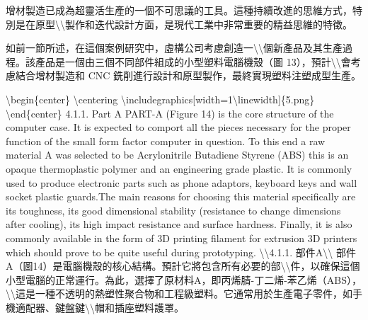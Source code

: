 增材製造已成為超靈活生產的一個不可思議的工具。這種持續改進的思維方式，特別是在原型\textbackslash\textbackslash 製作和迭代設計方面，是現代工業中非常重要的精益思維的特徵。

如前一節所述，在這個案例研究中，虛構公司考慮創造一\textbackslash\textbackslash 個新產品及其生產過程。該產品是一個由三個不同部件組成的小型塑料電腦機殼（圖
13），預計\textbackslash\textbackslash 會考慮結合增材製造和 CNC
銑削進行設計和原型製作，最終實現塑料注塑成型生產。

\textbackslash begin\{center\} \textbackslash centering
\textbackslash includegraphics{[}width=1\textbackslash linewidth{]}\{5.png\}
\textbackslash end\{center\} 4.1.1. Part A PART-A (Figure 14) is the
core structure of the computer case. It is expected to comport all the
pieces necessary for the proper function of the small form factor
computer in question. To this end a raw material A was selected to be
Acrylonitrile Butadiene Styrene (ABS) this is an opaque thermoplastic
polymer and an engineering grade plastic. It is commonly used to produce
electronic parts such as phone adaptors, keyboard keys and wall socket
plastic guards.The main reasons for choosing this material specifically
are its toughness, its good dimensional stability (resistance to change
dimensions after cooling), its high impact resistance and surface
hardness. Finally, it is also commonly available in the form of 3D
printing filament for extrusion 3D printers which should prove to be
quite useful during prototyping. \textbackslash\textbackslash4.1.1.
部件A\textbackslash\textbackslash{}
部件A（圖14）是電腦機殼的核心結構。預計它將包含所有必要的部\textbackslash\textbackslash 件，以確保這個小型電腦的正常運行。為此，選擇了原材料A，即丙烯腈-丁二烯-苯乙烯（ABS），\textbackslash\textbackslash 這是一種不透明的熱塑性聚合物和工程級塑料。它通常用於生產電子零件，如手機適配器、鍵盤鍵\textbackslash\textbackslash 帽和插座塑料護罩。

